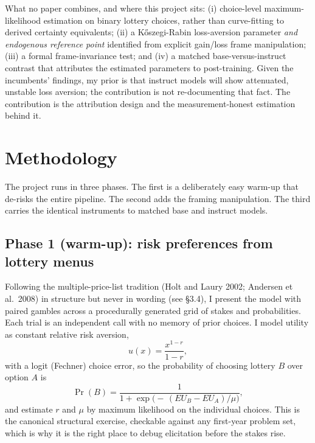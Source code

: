 \documentclass[11pt]{article}
\begin{document}
What no paper combines, and where this project sits: (i) choice-level maximum-likelihood estimation on
binary lottery choices, rather than curve-fitting to derived certainty equivalents; (ii) a
K\H{o}szegi-Rabin loss-aversion parameter \emph{and endogenous reference point} identified from
explicit gain/loss frame manipulation; (iii) a formal frame-invariance test; and (iv) a matched
base-versus-instruct contrast that attributes the estimated parameters to post-training. Given the
incumbents' findings, my prior is that instruct models will show attenuated, unstable loss aversion;
the contribution is not re-documenting that fact. The contribution is the attribution design and the
measurement-honest estimation behind it.

\section{Methodology}

The project runs in three phases. The first is a deliberately easy warm-up that de-risks the entire
pipeline. The second adds the framing manipulation. The third carries the identical instruments to
matched base and instruct models.

\subsection{Phase 1 (warm-up): risk preferences from lottery menus}
Following the multiple-price-list tradition (Holt and Laury 2002; Andersen et al.\ 2008) in structure
but never in wording (see \S3.4), I present the model with paired gambles across a procedurally
generated grid of stakes and probabilities. Each trial is an independent call with no memory of prior
choices. I model utility as constant relative risk aversion,
\[
  u(x) = \frac{x^{1-r}}{1-r},
\]
with a logit (Fechner) choice error, so the probability of choosing lottery $B$ over option $A$ is
\[
  \Pr(B) = \frac{1}{1 + \exp\!\big(-\,(EU_B - EU_A)/\mu\big)},
\]
and estimate $r$ and $\mu$ by maximum likelihood on the individual choices. This is the canonical
structural exercise, checkable against any first-year problem set, which is why it is the right place
to debug elicitation before the stakes rise.
\end{document}
